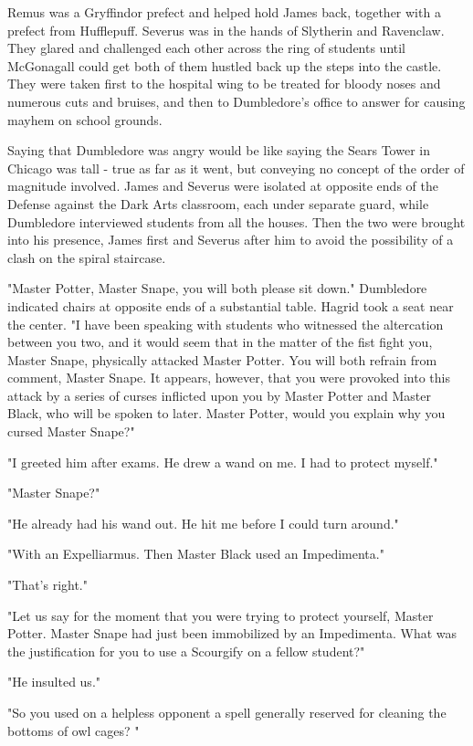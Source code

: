 \documentclass[a4paper,11pt]{article}
\begin{document}
Remus was a Gryffindor prefect and helped hold James back, together with a prefect from Hufflepuff. Severus was in the hands of Slytherin and Ravenclaw. They glared and challenged each other across the ring of students until McGonagall could get both of them hustled back up the steps into the castle. They were taken first to the hospital wing to be treated for bloody noses and numerous cuts and bruises, and then to Dumbledore's office to answer for causing mayhem on school grounds.

Saying that Dumbledore was angry would be like saying the Sears Tower in Chicago was tall - true as far as it went, but conveying no concept of the order of magnitude involved. James and Severus were isolated at opposite ends of the Defense against the Dark Arts classroom, each under separate guard, while Dumbledore interviewed students from all the houses. Then the two were brought into his presence, James first and Severus after him to avoid the possibility of a clash on the spiral staircase.

"Master Potter, Master Snape, you will both please sit down." Dumbledore indicated chairs at opposite ends of a substantial table. Hagrid took a seat near the center. "I have been speaking with students who witnessed the altercation between you two, and it would seem that in the matter of the fist fight you, Master Snape, physically attacked Master Potter. You will both refrain from comment, Master Snape. It appears, however, that you were provoked into this attack by a series of curses inflicted upon you by Master Potter and Master Black, who will be spoken to later. Master Potter, would you explain why you cursed Master Snape?"

"I greeted him after exams. He drew a wand on me. I had to protect myself."

"Master Snape?"

"He already had his wand out. He hit me before I could turn around."

"With an Expelliarmus. Then Master Black used an Impedimenta."

"That's right."

"Let us say for the moment that you were trying to protect yourself, Master Potter. Master Snape had just been immobilized by an Impedimenta. What was the justification for you to use a Scourgify on a fellow student?"

"He insulted us."

"So you used on a helpless opponent a spell generally reserved for cleaning the bottoms of owl cages? "
\end{document}
